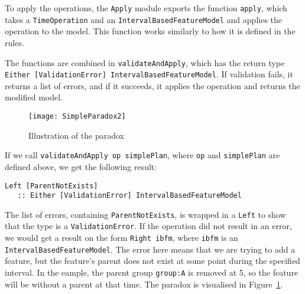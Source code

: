 To apply the operations, the \texttt{Apply} module exports the function \texttt{apply}, which takes a \texttt{Time\-Operation} and an \texttt{Interval\-Based\-Feature\-Model} and applies the operation to the model. This function works similarly to how it is defined in the rules.

The functions are combined in \texttt{validate\-And\-Apply}, which has the return type \texttt{Either [Validation\-Error] Interval\-Based\-Feature\-Model}. If validation fails, it returns a list of errors, and if it succeeds, it applies the operation and returns the modified model.
\begin{figure}
   \centering
      \texttt{[image: SimpleParadox2]}
   \caption{Illustration of the paradox}
   \label{ex:simple-plan2}
\end{figure}
If we call \texttt{validateAndApply op simplePlan}, where \texttt{op} and \texttt{simplePlan} are defined above, we get the following result:
\begin{verbatim}
Left [ParentNotExists] 
   :: Either [ValidationError] IntervalBasedFeatureModel
\end{verbatim}
The list of errors, containing \texttt{Parent\-Not\-Exists}, is wrapped in a \texttt{Left} to show that the type is a \texttt{Validation\-Error}. If the operation did not result in an error, we would get a result on the form \texttt{Right ibfm}, where \texttt{ibfm} is an \texttt{Interval\-Based\-Feature\-Model}. The error here means that we are trying to add a feature, but the feature's parent does not exist at some point during the specified interval. In the eample, the parent group \texttt{group:A} is removed at 5, so the feature will be without a parent at that time. The paradox is visualised in Figure~\ref{ex:simple-plan2}.

